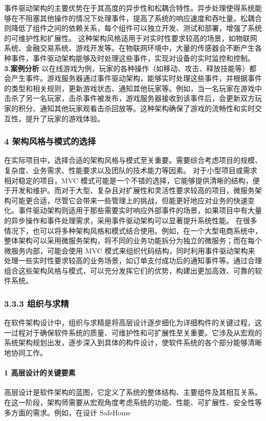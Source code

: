 事件驱动架构的主要优势在于其高度的异步性和松耦合特性。异步处理使得系统能够在不阻塞其他操作的情况下处理事件，提高了系统的响应速度和吞吐量。松耦合则降低了组件之间的依赖关系，每个组件可以独立开发、测试和部署，增强了系统的可维护性和扩展性。 这种架构风格适用于对实时性要求较高的场景，如物联网系统、金融交易系统、游戏开发等。在物联网环境中，大量的传感器会不断产生各种事件，事件驱动架构能够及时处理这些事件，实现对设备的实时监控和控制。 \textbf{3.案例分析} 以在线游戏为例，玩家的各种操作（如移动、攻击、释放技能等）都会产生事件。游戏服务器通过事件驱动架构，能够实时处理这些事件，并根据事件的类型和相关规则，更新游戏状态、通知其他玩家等。例如，当一名玩家在游戏中击杀了另一名玩家，击杀事件被发布，游戏服务器接收到该事件后，会更新双方玩家的积分、通知其他玩家观看击杀回放等。这种架构确保了游戏的流畅性和实时交互性，提升了玩家的游戏体验。 \subsubsection{4 架构风格与模式的选择}\label{ux67b6ux6784ux98ceux683cux4e0eux6a21ux5f0fux7684ux9009ux62e9} 在实际项目中，选择合适的架构风格与模式至关重要。需要综合考虑项目的规模、复杂度、业务需求、性能要求以及团队的技术能力等因素。 对于小型项目或需求相对稳定的项目，MVC 模式可能是一个不错的选择，它能够提供清晰的结构，便于开发和维护。而对于大型、复杂且对扩展性和灵活性要求较高的项目，微服务架构可能更合适，尽管它会带来一些管理上的挑战，但能更好地应对业务的快速变化。事件驱动架构则适用于那些需要实时响应外部事件的场景，如果项目中有大量的异步操作和事件处理需求，采用事件驱动架构可以显著提升系统性能。 在很多情况下，也可以将多种架构风格和模式结合使用。例如，在一个大型电商系统中，整体架构可以采用微服务架构，将不同的业务功能拆分为独立的微服务；而在每个微服务内部，可能会使用 MVC 模式来组织代码结构，同时利用事件驱动架构来处理一些实时性要求较高的业务场景，如订单支付成功后的通知事件等。通过合理组合这些架构风格与模式，可以充分发挥它们的优势，构建出更加高效、可靠的软件系统。 \subsubsection{3.3.3 组织与求精}\label{ux7ec4ux7ec7ux4e0eux6c42ux7cbe} 在软件架构设计中，组织与求精是将高层设计逐步细化为详细构件的关键过程，这一过程对于确保软件系统的质量、可维护性和可扩展性至关重要。它涉及从宏观的系统架构规划出发，逐步深入到具体的构件设计，使软件系统的各个部分能够清晰地协同工作。 \paragraph{1 高层设计的关键要素}\label{ux9ad8ux5c42ux8bbeux8ba1ux7684ux5173ux952eux8981ux7d20} 高层设计是软件架构的蓝图，它定义了系统的整体结构、主要组件及其相互关系。在这一阶段，架构师需要从宏观角度考虑系统的功能、性能、可扩展性、安全性等多方面的需求。例如，在设计 SafeHome 